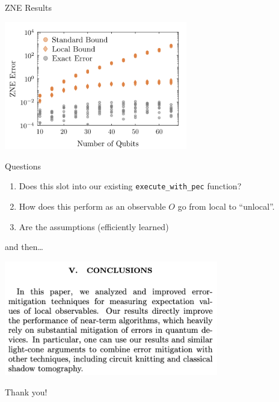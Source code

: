\documentclass[11pt,aspectratio=1610,xcolor=dvipsnames]{beamer}
\begin{document}
\begin{frame}{ZNE Results}
	\begin{center}
		\includegraphics[width=0.6\textwidth]{zne-bounds}
	\end{center}
\end{frame}


\begin{frame}[fragile]{Questions}
	\begin{enumerate}
		\item Does this slot into our existing \verb|execute_with_pec| function?
		\item How does this perform as an observable $O$ go from local to ``unlocal''.
		\item Are the assumptions (efficiently learned)
	\end{enumerate}
\end{frame}

\begin{frame}{and then\dots}
	\begin{center}
		\includegraphics[width=0.7\textwidth]{lookahead}
	\end{center}
\end{frame}

\begin{frame}[standout]
	Thank you!
\end{frame}
\end{document}

